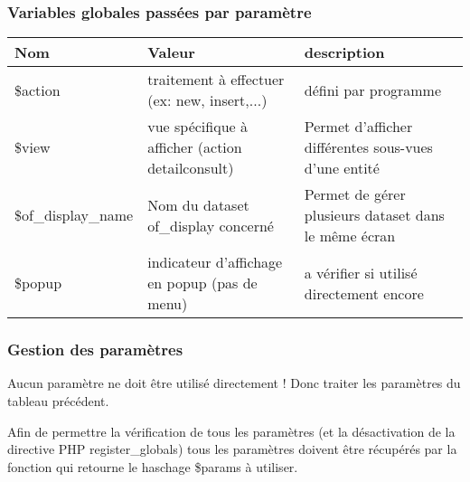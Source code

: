 \subsubsection{Variables globales passées par paramètre}

\begin{tabular}{|p{2cm}|p{5cm}|p{6cm}|}
\hline
\textbf{Nom} & \textbf{Valeur} & \textbf{description}  \\
\hline
\$action & traitement à effectuer (ex: new, insert,...) & défini par programme \\ 
\hline
\$view & vue spécifique à afficher (action detailconsult) & Permet d'afficher différentes sous-vues d'une entité \\ 
\hline
\$of\_display\_name & Nom du dataset of\_display concerné & Permet de gérer plusieurs dataset dans le même écran \\ 
\hline
\$popup & indicateur d'affichage en popup (pas de menu) & a vérifier si utilisé directement encore \\ 
\hline
\end{tabular}

\subsubsection{Gestion des paramètres}

Aucun paramètre ne doit être utilisé directement ! Donc traiter les paramètres du tableau précédent.

Afin de permettre la vérification de tous les paramètres (et la désactivation de la directive PHP register\_globals) tous les paramètres doivent être récupérés par la fonction  qui retourne le haschage \$params à utiliser.
